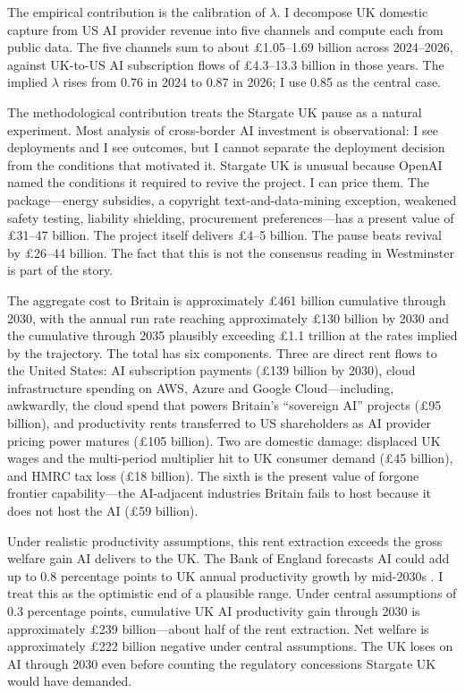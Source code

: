 \documentclass[11pt,letterpaper]{article}
\theoremstyle{remark}
\begin{document}
The empirical contribution is the calibration of $\lambda$. I decompose {UK} domestic capture from {US} {AI} provider revenue into five channels and compute each from public data. The five channels sum to about \pounds1.05--1.69 billion across 2024--2026, against {UK}-to-{US} {AI} subscription flows of \pounds4.3--13.3 billion in those years. The implied $\lambda$ rises from 0.76 in 2024 to 0.87 in 2026; I use 0.85 as the central case.

The methodological contribution treats the Stargate {UK} pause as a natural experiment. Most analysis of cross-border {AI} investment is observational: I see deployments and I see outcomes, but I cannot separate the deployment decision from the conditions that motivated it. Stargate {UK} is unusual because OpenAI named the conditions it required to revive the project. I can price them. The package---energy subsidies, a copyright text-and-data-mining exception, weakened safety testing, liability shielding, procurement preferences---has a present value of \pounds31--47 billion. The project itself delivers \pounds4--5 billion. The pause beats revival by \pounds26--44 billion. The fact that this is not the consensus reading in Westminster is part of the story.

The aggregate cost to Britain is approximately \pounds461 billion cumulative through 2030, with the annual run rate reaching approximately \pounds130 billion by 2030 and the cumulative through 2035 plausibly exceeding \pounds1.1 trillion at the rates implied by the trajectory. The total has six components. Three are direct rent flows to the United States: {AI} subscription payments (\pounds139 billion by 2030), cloud infrastructure spending on {AWS}, Azure and Google Cloud---including, awkwardly, the cloud spend that powers Britain's ``sovereign {AI}'' projects (\pounds95 billion), and productivity rents transferred to {US} shareholders as {AI} provider pricing power matures (\pounds105 billion). Two are domestic damage: displaced {UK} wages and the multi-period multiplier hit to {UK} consumer demand (\pounds45 billion), and HMRC tax loss (\pounds18 billion). The sixth is the present value of forgone frontier capability---the {AI}-adjacent industries Britain fails to host because it does not host the {AI} (\pounds59 billion).

Under realistic productivity assumptions, this rent extraction exceeds the gross welfare gain {AI} delivers to the {UK}. The Bank of England forecasts {AI} could add up to 0.8 percentage points to {UK} annual productivity growth by mid-2030s \citep{bank_of_england_2025}. I treat this as the optimistic end of a plausible range. Under central assumptions of 0.3 percentage points, cumulative {UK} {AI} productivity gain through 2030 is approximately \pounds239 billion---about half of the rent extraction. Net welfare is approximately \pounds222 billion negative under central assumptions. The {UK} loses on {AI} through 2030 even before counting the regulatory concessions Stargate {UK} would have demanded.
\end{document}
